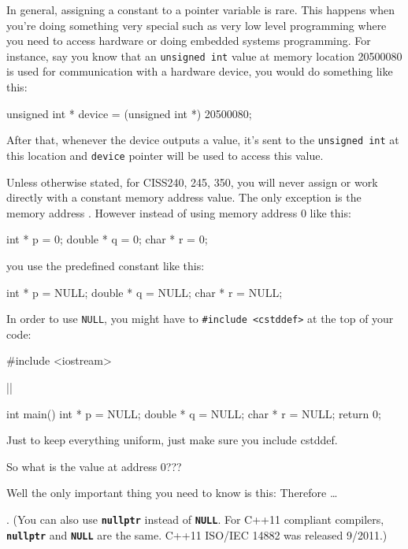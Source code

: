 In general, assigning a constant to a pointer variable is rare. This happens when you're doing something very special such as very low level programming where you need to access hardware or doing embedded systems programming. For instance, say you know that an \texttt{unsigned int} value at memory location 20500080 is used for communication with a hardware device, you would do something like this:

\begin{consolethree}[escapeinside=||]
unsigned int * device = (unsigned int *) 20500080;
\end{consolethree}

After that, whenever the device outputs a value, it's sent to the \texttt{unsigned int} at this location and \texttt{device} pointer will be used to access this value.

Unless otherwise stated, for CISS240, 245, 350, you will never assign or work directly with a constant memory address value. The only exception is the memory address . However instead of using memory address 0 like this:

\begin{consolethree}[escapeinside=||]
int * p = 0;
double * q = 0;
char * r = 0;
\end{consolethree}
you use the predefined constant \texttt{} like this:

\begin{consolethree}[escapeinside=||]
int * p = NULL;
double * q = NULL;
char * r = NULL;
\end{consolethree}

In order to use \texttt{NULL}, you might have to \texttt{\#include <cstddef>} at the top of your code:

\begin{consolethree}[escapeinside=||]
#include <iostream>

||

int main()
{
    int * p = NULL;
    double * q = NULL;
    char * r = NULL;
    return 0;
}
\end{consolethree}
Just to keep everything uniform, just make sure you include cstddef.

So what is the value at address 0???

Well the only important thing you need to know is this:  Therefore \ldots{}

. (You can also use \texttt{\textbf{nullptr}} instead of \texttt{\textbf{NULL}}. For C++11 compliant compilers, \texttt{\textbf{nullptr}} and \texttt{\textbf{NULL}} are the same. C++11 ISO/IEC 14882 was released 9/2011.)

